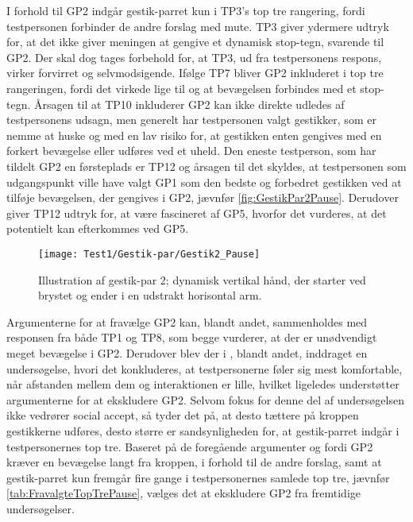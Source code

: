 \noindent
% 
I forhold til GP2 indgår gestik-parret kun i TP3's top tre rangering, fordi testpersonen forbinder de andre forslag med mute. TP3 giver ydermere udtryk for, at det ikke giver meningen at gengive et dynamisk stop-tegn, svarende til GP2. Der skal dog tages forbehold for, at TP3, ud fra testpersonens respons, virker forvirret og selvmodsigende. Ifølge TP7 bliver GP2 inkluderet i top tre rangeringen, fordi det virkede lige til og at bevægelsen forbindes med et stop-tegn. Årsagen til at TP10 inkluderer GP2 kan ikke direkte udledes af testpersonens udsagn, men generelt har testpersonen valgt gestikker, som er nemme at huske og med en lav risiko for, at gestikken enten gengives med en forkert bevægelse eller udføres ved et uheld. Den eneste testperson, som har tildelt GP2 en førsteplads er TP12 og årsagen til det skyldes, at testpersonen som udgangspunkt ville have valgt GP1 som den bedste og forbedret gestikken ved at tilføje bevægelsen, der gengives i GP2, jævnfør \autoref{fig:GestikPar2Pause}. Derudover giver TP12 udtryk for, at være fascineret af GP5, hvorfor det vurderes, at det potentielt kan efterkommes ved GP5. 
%
\begin{figure}[H]
	\centering
	\texttt{[image: Test1/Gestik-par/Gestik2\_Pause]}
	\caption{Illustration af gestik-par 2; dynamisk vertikal hånd, der starter ved brystet og ender i en udstrakt horisontal arm.}
	\label{fig:GestikPar2Pause}
\end{figure}
\noindent
% 
Argumenterne for at fravælge GP2 kan, blandt andet, sammenholdes med responsen fra både TP1 og TP8, som begge vurderer, at der er unødvendigt meget bevægelse i GP2. Derudover blev der i , blandt andet, inddraget en undersøgelse, hvori det konkluderes, at testpersonerne føler sig mest komfortable, når afstanden mellem dem og interaktionen er lille, hvilket ligeledes understøtter argumenterne for at ekskludere GP2. Selvom fokus for denne del af undersøgelsen ikke vedrører social accept, så tyder det på, at desto tættere på kroppen gestikkerne udføres, desto større er sandsynligheden for, at gestik-parret indgår i testpersonernes top tre. Baseret på de foregående argumenter og fordi GP2 kræver en bevægelse langt fra kroppen, i forhold til de andre forslag, samt at gestik-parret kun fremgår fire gange i testpersonernes samlede top tre, jævnfør \autoref{tab:FravalgteTopTrePause}, vælges det at ekskludere GP2 fra fremtidige undersøgelser. 
%
